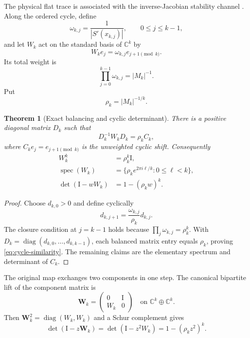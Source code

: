 \documentclass[11pt]{article}
\newtheorem{theorem}{Theorem}[section]
\theoremstyle{definition}
\theoremstyle{remark}
\newcommand{\C}{\mathbb C}
\newcommand{\Id}{\mathrm I}
\newcommand{\bW}{\mathbf W}
\newcommand{\spec}{\operatorname{spec}}
\begin{document}
The physical flat trace is associated with the inverse-Jacobian stability
channel \citep{Baladi2000}.  Along the ordered cycle, define
\begin{equation}\label{eq:weights}
 \omega_{k,j}=\frac1{|S'(x_{k,j})|},
 \qquad 0\le j\le k-1,
\end{equation}
and let $W_k$ act on the standard basis of $\C^k$ by
\begin{equation}\label{eq:weighted-shift}
 W_ke_j=\omega_{k,j}e_{j+1\pmod k}.
\end{equation}
Its total weight is
\begin{equation}\label{eq:weight-product}
 \prod_{j=0}^{k-1}\omega_{k,j}=|M_k|^{-1}.
\end{equation}
Put
\begin{equation}\label{eq:rho-definition}
 \rho_k=|M_k|^{-1/k}.
\end{equation}

\begin{theorem}[Exact balancing and cyclic determinant]
\label{thm:weighted-cycle}
There is a positive diagonal matrix $D_k$ such that
\begin{equation}\label{eq:cycle-similarity}
 D_k^{-1}W_kD_k=\rho_kC_k,
\end{equation}
where $C_ke_j=e_{j+1\pmod k}$ is the unweighted cyclic shift.  Consequently
\begin{align}
 W_k^k&=\rho_k^k\Id,
 \label{eq:W-power}\\
 \spec(W_k)&=\{\rho_ke^{2\pi i\ell/k}:0\le\ell<k\},
 \label{eq:W-spectrum}\\
 \det(\Id-wW_k)&=1-(\rho_kw)^k.
 \label{eq:W-determinant}
\end{align}
\end{theorem}

\begin{proof}
Choose $d_{k,0}>0$ and define cyclically
\begin{equation}\label{eq:d-recurrence}
 d_{k,j+1}=\frac{\omega_{k,j}}{\rho_k}d_{k,j}.
\end{equation}
The closure condition at $j=k-1$ holds because
$\prod_j\omega_{k,j}=\rho_k^k$.  With
$D_k=\operatorname{diag}(d_{k,0},\ldots,d_{k,k-1})$, each balanced matrix
entry equals $\rho_k$, proving \eqref{eq:cycle-similarity}.  The remaining
claims are the elementary spectrum and determinant of $C_k$.
\end{proof}

The original map exchanges two components in one step.  The canonical
bipartite lift of the component matrix is
\begin{equation}\label{eq:bipartite-lift}
 \bW_k=
 \begin{pmatrix}
  0&\Id\\
  W_k&0
 \end{pmatrix}
 \quad\text{on }\C^k\oplus\C^k.
\end{equation}
Then
$\bW_k^2=\operatorname{diag}(W_k,W_k)$ and a Schur complement gives
\begin{equation}\label{eq:bipartite-determinant}
 \det(\Id-z\bW_k)
 =\det(\Id-z^2W_k)
 =1-(\rho_kz^2)^k.
\end{equation}
\end{document}
